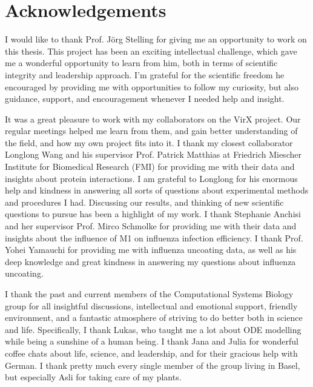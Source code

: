 
\bigskip

\begingroup
\let\clearpage\relax
\let\cleardoublepage\relax
\let\cleardoublepage\relax
\chapter*{Acknowledgements}

\def\thanks#1{%
\begingroup
\leftskip1em
\noindent #1
\par
\endgroup
}

I would like to thank Prof. J\"org Stelling for giving me an opportunity to work on this thesis. This project has been an exciting intellectual challenge, which gave me a wonderful opportunity to learn from him, both in terms of scientific integrity and leadership approach. I'm grateful for the scientific freedom he encouraged by providing me with opportunities to follow my curiosity, but also guidance, support, and encouragement whenever I needed help and insight.

It was a great pleasure to work with my collaborators on the VirX project. Our regular meetings helped me learn from them, and gain better understanding of the field, and how my own project fits into it. I thank my closest collaborator Longlong Wang and his supervisor Prof. Patrick Matthias at Friedrich Miescher Institute for Biomedical Research (FMI) for providing me with their data and insights about protein interactions. I am grateful to Longlong for his enormous help and kindness in answering all sorts of questions about experimental methods and procedures I had. Discussing our results, and thinking of new scientific questions to pursue has been a highlight of my work. I thank Stephanie Anchisi and her supervisor Prof. Mirco Schmolke for providing me with their data and insights about the influence of M1 on influenza infection efficiency. I thank Prof. Yohei Yamauchi for providing me with influenza uncoating data, as well as his deep knowledge and great kindness in answering my questions about influenza uncoating. 

I thank the past and current members of the Computational Systems Biology group for all insightful discussions, intellectual and emotional support, friendly environment, and a fantastic atmosphere of striving to do better both in science and life. Specifically, I thank Lukas, who taught me a lot about ODE modelling while being a sunshine of a human being. I thank Jana and Julia for wonderful coffee chats about life, science, and leadership, and for their gracious help with German. I thank pretty much every single member of the group living in Basel, but especially Asli for taking care of my plants.

